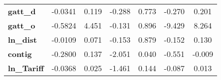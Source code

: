 \begin{center}
\begin{tabular}{lcccccc}
\textbf{gatt\_d}                                                   &      -0.0341  &        0.119     &    -0.288  &         0.773        &       -0.270    &        0.201     \\
\textbf{gatt\_o}                                                   &      -0.5824  &        4.451     &    -0.131  &         0.896        &       -9.429    &        8.264     \\
\textbf{ln\_dist}                                                  &      -0.0109  &        0.071     &    -0.153  &         0.879        &       -0.152    &        0.130     \\
\textbf{contig}                                                    &      -0.2800  &        0.137     &    -2.051  &         0.040        &       -0.551    &       -0.009     \\
\textbf{ln\_Tariff}                                                &      -0.0368  &        0.025     &    -1.461  &         0.144        &       -0.087    &        0.013     \\
\bottomrule
\end{tabular}
\end{center}